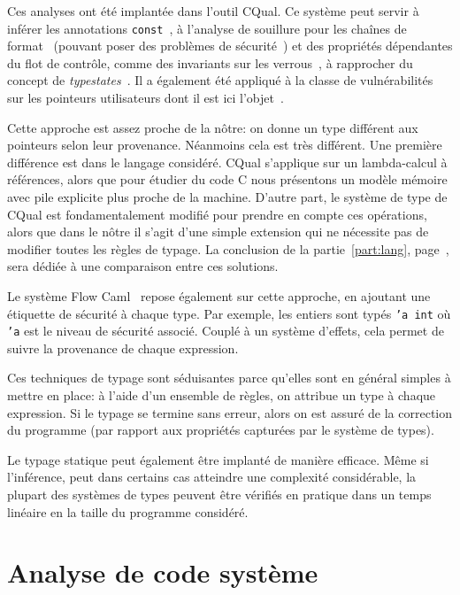 Ces analyses ont été implantée dans l'outil CQual. Ce système peut servir à
inférer les annotations \texttt{const}~\cite{pldi99}, à l'analyse de souillure
pour les chaînes de format~\cite{usenix01} (pouvant poser des problèmes de
sécurité~\cite{format-string-attacks}) et des propriétés dépendantes du flot de
contrôle, comme des invariants sur les verrous~\cite{pldi02}, à rapprocher du
concept de \emph{typestates}~\cite{tse12-typestate}. Il a également été appliqué
à la classe de vulnérabilités sur les pointeurs utilisateurs dont il est ici
l'objet~\cite{cquk-usenix04}.

Cette approche est assez proche de la nôtre: on donne un type différent aux
pointeurs selon leur provenance. Néanmoins cela est très différent. Une première
différence est dans le langage considéré. CQual s'applique sur un lambda-calcul
à références, alors que pour étudier du code C nous présentons un modèle mémoire
avec pile explicite plus proche de la machine. D'autre part, le système de type
de CQual est fondamentalement modifié pour prendre en compte ces opérations,
alors que dans le nôtre il s'agit d'une simple extension qui ne nécessite pas de
modifier toutes les règles de typage. La conclusion de la
partie~\ref{part:lang}, page~\pageref{cha:ccl2}, sera dédiée à une comparaison
entre ces solutions.

Le système Flow Caml~\cite{flowcaml} repose également sur cette approche, en
ajoutant une étiquette de sécurité à chaque type. Par exemple, les entiers sont
typés \texttt{'a int} où \texttt{'a} est le niveau de sécurité associé. Couplé à
un système d'effets, cela permet de suivre la provenance de chaque expression.

Ces techniques de typage sont séduisantes parce qu'elles sont en général simples
à mettre en place: à l'aide d'un ensemble de règles, on attribue un type à
chaque expression. Si le typage se termine sans erreur, alors on est assuré de
la correction du programme (par rapport aux propriétés capturées par le système
de types).

Le typage statique peut également être implanté de manière efficace. Même si
l'inférence, peut dans certains cas atteindre une complexité considérable, la
plupart des systèmes de types peuvent être vérifiés en pratique dans un temps
linéaire en la taille du programme considéré.

\section{Analyse de code système}

